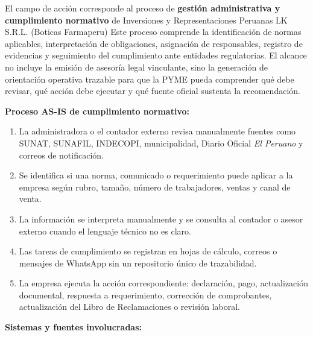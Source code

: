 \documentclass[12pt,a4paper,oneside]{report}
\begin{document}
El campo de acción corresponde al proceso de \textbf{gestión administrativa y cumplimiento normativo} de Inversiones y Representaciones Peruanas LK S.R.L. (Boticas Farmaperu) Este proceso comprende la identificación de normas aplicables, interpretación de obligaciones, asignación de responsables, registro de evidencias y seguimiento del cumplimiento ante entidades regulatorias. El alcance no incluye la emisión de asesoría legal vinculante, sino la generación de orientación operativa trazable para que la PYME pueda comprender qué debe revisar, qué acción debe ejecutar y qué fuente oficial sustenta la recomendación.

\textbf{Proceso AS-IS de cumplimiento normativo:}

\begin{enumerate}
\item La administradora o el contador externo revisa manualmente fuentes como SUNAT, SUNAFIL, INDECOPI, municipalidad, Diario Oficial \textit{El Peruano} y correos de notificación.
\item Se identifica si una norma, comunicado o requerimiento puede aplicar a la empresa según rubro, tamaño, número de trabajadores, ventas y canal de venta.
\item La información se interpreta manualmente y se consulta al contador o asesor externo cuando el lenguaje técnico no es claro.
\item Las tareas de cumplimiento se registran en hojas de cálculo, correos o mensajes de WhatsApp sin un repositorio único de trazabilidad.
\item La empresa ejecuta la acción correspondiente: declaración, pago, actualización documental, respuesta a requerimiento, corrección de comprobantes, actualización del Libro de Reclamaciones o revisión laboral.
\end{enumerate}

\textbf{Sistemas y fuentes involucradas:}
\end{document}
